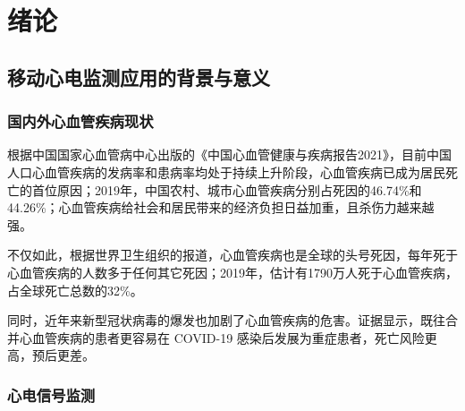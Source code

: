 \documentclass{ecnuthesis}
\begin{document}
    \newcommand*{\app}{移动心电监测应用}


    \frontmatter

    \begin{abstract}
    \end{abstract}

    \begin{abstractEN}
    \end{abstractEN}

    \mainmatter


    \chapter{绪论}\label{ch:intro}


    \section{\app 的背景与意义}\label{sec:background}

    \subsection{国内外心血管疾病现状}\label{subsec:disease}

    根据中国国家心血管病中心出版的《中国心血管健康与疾病报告2021》，目前中国人口心血管疾病的发病率和患病率均处于持续上升阶段，心血管疾病已成为居民死亡的首位原因；2019年，中国农村、城市心血管疾病分别占死因的46.74\%和44.26\%；心血管疾病给社会和居民带来的经济负担日益加重，且杀伤力越来越强\cite{Zhongguoxinxieguanjiankangyujibingbaogao20212022}。

    不仅如此，根据世界卫生组织的报道，心血管疾病也是全球的头号死因，每年死于心血管疾病的人数多于任何其它死因；2019年，估计有1790万人死于心血管疾病，占全球死亡总数的32\%\cite{CardiovascularDiseasesCVDs}。

    同时，近年来新型冠状病毒的爆发也加剧了心血管疾病的危害。证据显示，既往合并心血管疾病的患者更容易在 COVID-19 感染后发展为重症患者，死亡风险更高，预后更差\cite{zhangXinxingguanzhuangbingdufeiyanyuxinxieguanjibing2020}。

    \subsection{心电信号监测}\label{subsec:monitoring}
\end{document}
